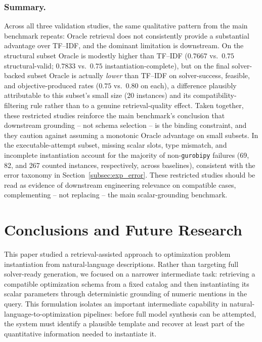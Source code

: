 \documentclass[pdflatex,sn-basic,Numbered]{sn-jnl}
\begin{document}
\subsubsection{Summary.} Across all three validation studies, the same qualitative pattern from the main benchmark repeats: Oracle retrieval does not consistently provide a substantial advantage over TF--IDF, and the dominant limitation is downstream. On the structural subset Oracle is modestly higher than TF--IDF ($0.7667$ vs.\ $0.75$ structural-valid; $0.7833$ vs.\ $0.75$ instantiation-complete), but on the final solver-backed subset Oracle is actually \emph{lower} than TF--IDF on solver-success, feasible, and objective-produced rates ($0.75$ vs.\ $0.80$ on each), a difference plausibly attributable to this subset's small size (20 instances) and its compatibility-filtering rule rather than to a genuine retrieval-quality effect. Taken together, these restricted studies reinforce the main benchmark's conclusion that downstream grounding -- not schema selection -- is the binding constraint, and they caution against assuming a monotonic Oracle advantage on small subsets. In the executable-attempt subset, missing scalar slots, type mismatch, and incomplete instantiation account for the majority of non-\texttt{gurobipy} failures (69, 82, and 267 counted instances, respectively, across baselines), consistent with the error taxonomy in Section~\ref{subsec:exp_error}. These restricted studies should be read as evidence of downstream engineering relevance on compatible cases, complementing -- not replacing -- the main scalar-grounding benchmark.

\section{Conclusions and Future Research}
\label{sec:conclusion}

This paper studied a retrieval-assisted approach to optimization problem instantiation from natural-language descriptions. Rather than targeting full solver-ready generation, we focused on a narrower intermediate task: retrieving a compatible optimization schema from a fixed catalog and then instantiating its scalar parameters through deterministic grounding of numeric mentions in the query. This formulation isolates an important intermediate capability in natural-language-to-optimization pipelines: before full model synthesis can be attempted, the system must identify a plausible template and recover at least part of the quantitative information needed to instantiate it.
\end{document}
